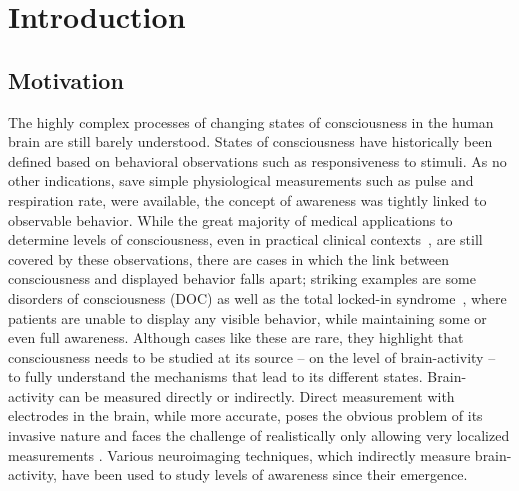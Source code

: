 \chapter{Introduction}\label{ch:introduction}




\section{Motivation}\label{sec:motivation}
The highly complex processes of changing states of consciousness in the human brain are still barely understood.
States of consciousness have historically been defined based on behavioral observations such as responsiveness to
stimuli.
As no other indications, save simple physiological measurements such as pulse and respiration rate,
were available, the concept of awareness was tightly linked to observable behavior.
While the great majority of medical applications to determine levels of consciousness,
even in practical clinical contexts~\cite{jain_glasgow_2022},
are still covered by these observations,
there are cases in which the link between consciousness and displayed behavior falls apart;
striking examples are some disorders of consciousness (DOC) as well as the total locked-in
syndrome~\cite{bauer_varieties_1979},
where patients are unable to display any visible behavior,
while maintaining some or even full awareness.
Although cases like these are rare, they highlight that consciousness needs to be studied at its source -- on the
level of brain-activity -- to fully understand the mechanisms that lead to its different states.
%
%
Brain-activity can be measured directly or indirectly.
Direct measurement with electrodes in the brain, while more accurate,
poses the obvious problem of its invasive nature and faces the challenge of realistically  only
allowing very localized measurements \citationneeded.
Various neuroimaging techniques, which indirectly measure brain-activity, have been used to study levels of
awareness since their emergence.
